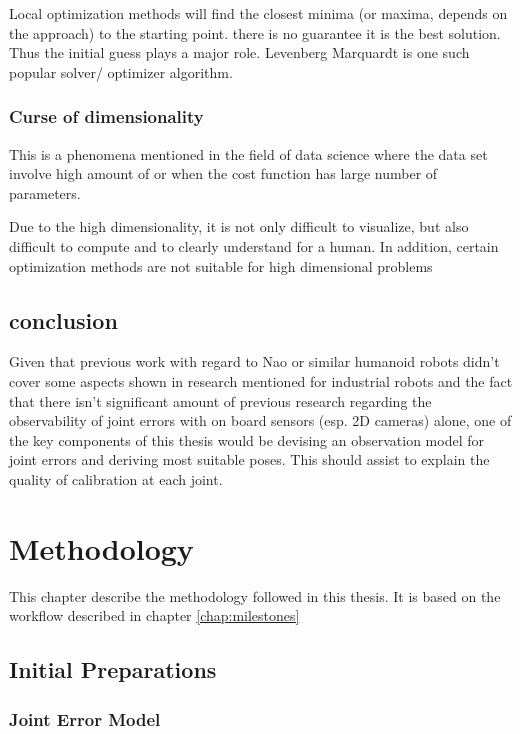 \documentclass[english, printversion, nomenclature, notitle]{tuvisionthesis} %
\begin{document}
Local optimization methods will find the closest minima (or maxima, depends on the approach) to the starting point. there is no guarantee it is the best solution. Thus the initial guess plays a major role. Levenberg Marquardt is one such popular solver/ optimizer algorithm.


\subsection{Curse of dimensionality}
This is a phenomena mentioned in the field of data science where the data set involve high amount of or when the cost function has large number of parameters.

Due to the high dimensionality, it is not only difficult to visualize, but also difficult to compute and to clearly understand for a human. In addition, certain optimization methods are not suitable for high dimensional problems 

\section{conclusion}
Given that previous work with regard to Nao or similar humanoid robots didn't cover some aspects shown in research mentioned for industrial robots and the fact that there isn't significant amount of previous research regarding the observability of joint errors with on board sensors (esp. 2D cameras) alone, one of the key components of this thesis would be devising an observation model for joint errors and deriving most suitable poses. This should assist to explain the quality of calibration at each joint. 

\chapter{Methodology}
\label{chap:methodology}
This chapter describe the methodology followed in this thesis. It is based on the workflow described in chapter \cref{chap:milestones}

\section{Initial Preparations}

\subsection{Joint Error Model}
\label{subsec:initial_joint_error}
\end{document}
